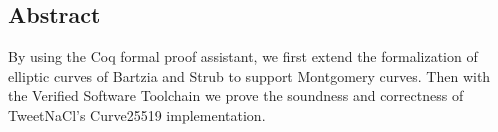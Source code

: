 \subsection*{Abstract}

By using the Coq formal proof assistant, we first extend
the formalization of elliptic curves of Bartzia and Strub \cite{DBLP:conf/itp/BartziaS14} to support
Montgomery curves. Then with the Verified Software Toolchain \cite{2012-Appel}
we prove the soundness and correctness of TweetNaCl's Curve25519 implementation.
